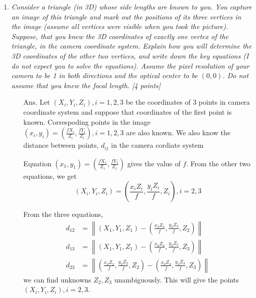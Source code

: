 \documentclass[11pt]{article}
\newcommand{\norm}[1]{\left\lVert#1\right\rVert}
\begin{document}
\begin{enumerate}
\item \textit{Consider a triangle (in 3D) whose side lengths are known to you. You capture an image of this triangle and mark out the positions of its three vertices in the image (assume all vertices were visible when you took the picture). Suppose, that you knew the 3D coordinates of exactly one vertex of the triangle, in the camera coordinate system. Explain how you will determine the 3D coordinates of the other two vertices, and write down the key equations (I do not expect you to solve the equations). Assume the pixel resolution of your camera to be 1 in both directions and the optical center to be $(0,0)$. Do not assume that you knew the focal length. \textsf{[4 points]}}
\begin{itemize}
	\item[Ans.]	Let $(X_i,Y_i,Z_i), i= 1,2,3$ be the coordinates of 3 points in camera coordinate system and suppose that coordinates of the first point is known. Correspoding points in the image $(x_i,y_i) = \left(\frac{fX_i}{Z_i},\frac{fY_i}{Z_i}\right), i = 1,2,3$ are also known. We also know the distance between points, $d_{ij}$ in the camera cordiate system
	

	Equation $(x_1,y_1) = \left(\frac{fX_1}{Z_1},\frac{fY_1}{Z_1}\right)$ gives the value of $f$. From the other two equations, we get 
	\[
	(X_i,Y_i,Z_i) = \left (\frac{x_iZ_i}{f},\frac{y_iZ_i}{f},Z_i\right ), i= 2,3
	\]

	From the three equations,
	\begin{align}
		d_{12} &= \norm{(X_1,Y_1,Z_1) - \left (\frac{x_2Z_2}{f},\frac{y_2Z_2}{f},Z_2 \right )} \\
		d_{13} &= \norm{(X_1,Y_1,Z_1) - \left (\frac{x_3Z_3}{f},\frac{y_3Z_3}{f},Z_3 \right )} \\
		d_{23} &= \norm{ \left (\frac{x_2Z_2}{f},\frac{y_2Z_2}{f},Z_2 \right )  -  \left (\frac{x_3Z_3}{f},\frac{y_3Z_3}{f},Z_3 \right )}
	\end{align}
	we can find unknowns $Z_2, Z_3$ unambiguously. This will give the points $(X_i,Y_i,Z_i), i= 2,3$.
\end{itemize}



\end{enumerate}
\end{document}
